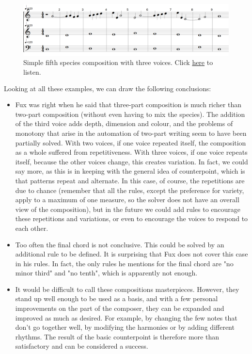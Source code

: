 \begin{figure}[h!]
    \centering
    \includegraphics[width=1\textwidth]{Images/Musicality/simple-test-5sp.png}
    \caption{Simple fifth species composition with three voices. Click \href{https://youtu.be/BSAKEjvFdoo}{here} to listen.}
    \label{fig:simple-test-5sp}
\end{figure}

Looking at all these examples, we can draw the following conclusions: 

\begin{itemize}
    \item Fux was right when he said that three-part composition is much richer than two-part composition (without even having to mix the species). The addition of the third voice adds depth, dimension and colour, and the problems of monotony that arise in the automation of two-part writing seem to have been partially solved. With two voices, if one voice repeated itself, the composition as a whole suffered from repetitiveness. With three voices, if one voice repeats itself, because the other voices change, this creates variation. In fact, we could say more, as this is in keeping with the general idea of counterpoint, which is that patterns repeat and alternate. In this case, of course, the repetitions are due to chance (remember that all the rules, except the preference for variety, apply to a maximum of one measure, so the solver does not have an overall view of the composition), but in the future we could add rules to encourage these repetitions and variations, or even to encourage the voices to respond to each other. 
    \item Too often the final chord is not conclusive. This could be solved by an additional rule to be defined. It is surprising that Fux does not cover this case in his rules. In fact, the only rules he mentions for the final chord are "no minor third" and "no tenth", which is apparently not enough.
    \item It would be difficult to call these compositions masterpieces. However, they stand up well enough to be used as a basis, and with a few personal improvements on the part of the composer, they can be expanded and improved as much as desired. For example, by changing the few notes that don't go together well, by modifying the harmonies or by adding different rhythms. The result of the basic counterpoint is therefore more than satisfactory and can be considered a success.
\end{itemize}


